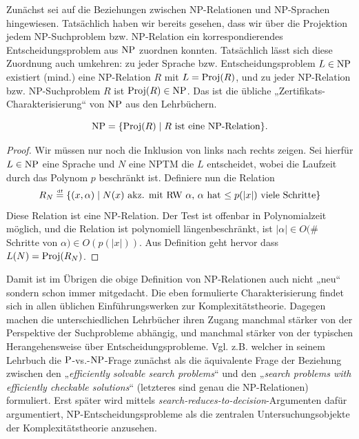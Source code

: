 Zunächst sei auf die Beziehungen zwischen NP-Relationen und NP-Sprachen hingewiesen.
Tatsächlich haben wir bereits gesehen, dass wir über die Projektion jedem NP-Suchproblem bzw. NP-Relation ein korrespondierendes Entscheidungsproblem aus $\NP$ zuordnen konnten. Tatsächlich lässt sich diese Zuordnung auch umkehren: zu jeder Sprache bzw. Entscheidungsproblem $L\in \NP$ existiert (mind.) eine NP-Relation $R$ mit $L=\Proj(R)$, und zu jeder NP-Relation bzw. NP-Suchproblem $R$ ist $\Proj(R)\in\NP$. Das ist die übliche „Zertifikats-Charakterisierung“ von $\NP$ aus den Lehrbüchern.
\begin{observation}\label{obs:np-certificate-def}
\[ \NP = \{ \Proj(R) \mid \text{$R$ ist eine NP-Relation} \}.\]
\end{observation}
\begin{proof}
    Wir müssen nur noch die Inklusion von links nach rechts zeigen. Sei hierfür $L\in\NP$ eine Sprache und $N$ eine NPTM die $L$ entscheidet, wobei die Laufzeit durch das Polynom $p$ beschränkt ist. Definiere nun die Relation
    \[ R_N  \defeq \{ (x, \alpha) \mid \text{$N(x)$ akz. mit RW $\alpha$, $\alpha$ hat $\leq p(|x|)$ viele Schritte} \} \]
    Diese Relation ist eine NP-Relation. Der Test ist offenbar in Polynomialzeit möglich, und die Relation ist polynomiell längenbeschränkt, ist $|\alpha|\in O($\# Schritte von $\alpha)\in O(p(|x|))$.
    Aus Definition geht hervor dass $L(N) = \Proj(R_N)$.
\end{proof}
Damit ist im Übrigen die obige Definition von NP-Relationen auch nicht „neu“ sondern schon immer mitgedacht. Die eben formulierte Charakterisierung findet sich in allen üblichen Einführungswerken zur Komplexitätstheorie. Dagegen machen die unterschiedlichen Lehrbücher ihren Zugang manchmal stärker von der Perspektive der Suchprobleme abhängig, und manchmal stärker von der typischen Herangehensweise über Entscheidungsprobleme.
Vgl. z.B. \textcite{goldreich_computational_2008} welcher in seinem Lehrbuch die $\P$-vs.-$\NP$-Frage zunächst als die äquivalente Frage der Beziehung zwischen den „\emph{efficiently solvable search problems}“ und den „\emph{search problems with efficiently checkable solutions}“ (letzteres sind genau die NP-Relationen) formuliert. Erst später wird mittels \emph{search-reduces-to-decision}-Argumenten dafür argumentiert, NP-Entscheidungsprobleme als die zentralen Untersuchungsobjekte der Komplexitätstheorie anzusehen.


